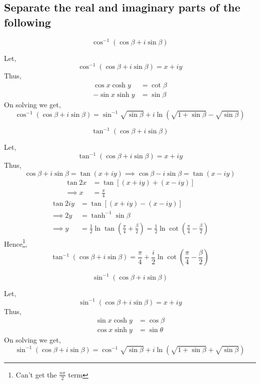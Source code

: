 \subsection{Separate the real and imaginary parts of the following}
\begin{asign}
	\[\cos^{-1}(\cos\beta+i\sin\beta)\]
\end{asign}
\begin{anse}
	Let,
	\[\cos^{-1}(\cos\beta+i\sin\beta)=x+iy\]
	Thus,
	\[\begin{split}
		\cos x\cosh y&=\cot\beta\\
		-\sin x\sinh y&=\sin\beta
	\end{split}\]
	On solving we get,
	\[\cos^{-1}(\cos\beta+i\sin\beta)=\sin^{-1}\sqrt{\sin\beta}+i\ln(\sqrt{1+\sin\beta}-\sqrt{\sin\beta})\]
\end{anse}
\begin{asign}
	\[\tan^{-1}(\cos\beta+i\sin\beta)\]
\end{asign}
\begin{anse}
	Let,
	\[\tan^{-1}(\cos\beta+i\sin\beta)=x+iy\]
	Thus,
	\[\cos\beta+i\sin\beta=\tan(x+iy)\implies\cos\beta-i\sin\beta=\tan(x-iy)\]
	\[\begin{split}
		\tan2x&=\tan[(x+iy)+(x-iy)]\\
		\implies x&=\frac{\pi}{4}
	\end{split}\]
	\[\begin{split}
		\tan2iy&=\tan[(x+iy)-(x-iy)]\\
		\implies 2y&=\tanh^{-1}\sin\beta\\
		\implies y&=\frac{1}{2}\ln\tan(\frac{\pi}{4}+\frac{\beta}{2})=\frac{1}{2}\ln\cot(\frac{\pi}{4}-\frac{\beta}{2})
	\end{split}\]
	Hence\footnote{Can't get the $\frac{n\pi}{2}$ term},
	\[\tan^{-1}(\cos\beta+i\sin\beta)=\frac{\pi}{4}+\frac{i}{2}\ln\cot(\frac{\pi}{4}-\frac{\beta}{2})\]
\end{anse}
\begin{asign}
	\[\sin^{-1}{(\cos\beta+i\sin\beta)}\] 
\end{asign}
\begin{anse}
	Let,
	\[\sin^{-1}(\cos\beta+i\sin\beta)=x+iy\]
	Thus,
	\[\begin{split}
		\sin x\cosh y&=\cos\beta\\
		\cos x\sinh y&=\sin\theta
	\end{split}\]
	On solving we get,
	\[\sin^{-1}(\cos\beta+i\sin\beta)=\cos^{-1}\sqrt{\sin\beta}+i\ln(\sqrt{1+\sin\beta}+\sqrt{\sin\beta})\]
\end{anse}
